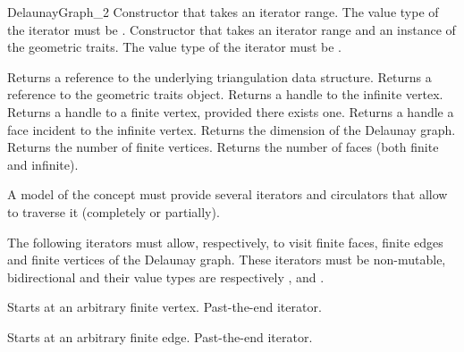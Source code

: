 \begin{ccRefConcept}{DelaunayGraph_2}
{Constructor that takes an iterator range. The value type of the
  iterator must be .}
\ccGlue
{}
{Constructor that takes an iterator range and an instance of the
  geometric traits. The value type of the iterator must be .}


{Returns a reference to the underlying triangulation data structure.}
\ccGlue
{}
{Returns a reference to the geometric traits object.}
\ccGlue
{}
{Returns a handle to the infinite vertex.}
\ccGlue
{}
{Returns a handle to a finite vertex, provided there exists one.}
\ccGlue
{}
{Returns a handle a face incident to the infinite vertex.}
\ccGlue
{}
{Returns the dimension of the Delaunay graph.}
\ccGlue
{}
{Returns the number of finite vertices.}
\ccGlue
{}
{Returns the number of faces (both finite and infinite).}



A model of the  concept must provide several
iterators and circulators that allow to traverse it (completely or
partially).




The following iterators must allow, respectively, to visit 
finite faces,  finite edges and  finite vertices
of the Delaunay graph. These iterators must be non-mutable,
bidirectional and their value types are respectively
,  and .

{Starts at an arbitrary finite vertex.}
\ccGlue
{}
{Past-the-end iterator.}

{Starts at an arbitrary finite edge.}
\ccGlue
{}
{Past-the-end iterator.}


\end{ccRefConcept}
